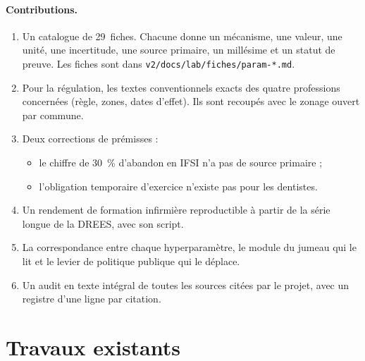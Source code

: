 \documentclass[11pt]{article}
\begin{document}
\paragraph{Contributions.}
\begin{enumerate}
\item Un catalogue de 29~fiches. Chacune donne un mécanisme, une valeur,
  une unité, une incertitude, une source primaire, un millésime et un statut
  de preuve. Les fiches sont dans \texttt{v2/docs/lab/fiches/param-*.md}.
\item Pour la régulation, les textes conventionnels exacts des quatre
  professions concernées (règle, zones, dates d'effet). Ils sont recoupés
  avec le zonage ouvert par commune.
\item Deux corrections de prémisses :
  \begin{itemize}
  \item le chiffre de 30~\% d'abandon en IFSI n'a pas de source primaire ;
  \item l'obligation temporaire d'exercice n'existe pas pour les dentistes.
  \end{itemize}
\item Un rendement de formation infirmière reproductible à partir de la
  série longue de la DREES, avec son script.
\item La correspondance entre chaque hyperparamètre, le module du jumeau qui
  le lit et le levier de politique publique qui le déplace.
\item Un audit en texte intégral de toutes les sources citées par le
  projet, avec un registre d'une ligne par citation.
\end{enumerate}

\section{Travaux existants}
\end{document}

